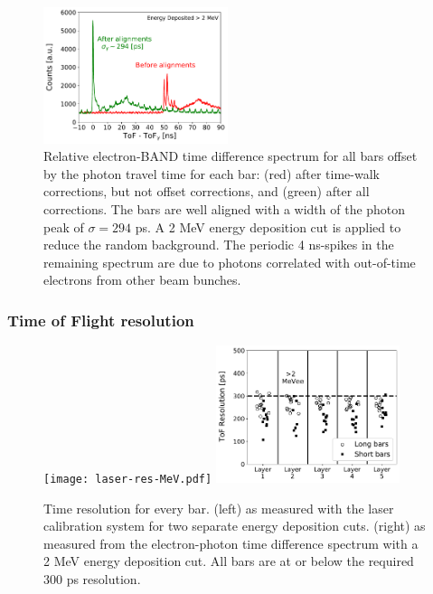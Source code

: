\documentclass[3p,final,twocolumn]{elsarticle}
\begin{document}
\begin{figure}[tb]
	\centering
		\includegraphics[width=0.48\textwidth]{time-alignment.pdf}
                \caption{Relative electron-BAND time difference
                  spectrum for all bars offset by the photon travel
                  time for each bar: (red) after time-walk
                  corrections, but not offset corrections, and (green)
                  after all corrections. The bars are well
                  aligned with a width of the photon peak of
                  $\sigma=294$ \si{\pico\s}. A 2
                  \si{\mega\electronvolt} energy deposition cut is
                  applied to reduce the random background.  The
                  periodic 4 \si{\nano\s}-spikes in the remaining
                  spectrum are due to photons correlated with out-of-time
                  electrons from other beam bunches.}
	\label{fig:final_offset}
\end{figure}

\subsubsection{Time of Flight resolution}
\label{sec:tofresolution}
\begin{figure}[tb]
	\centering
			\texttt{[image: laser-res-MeV.pdf]}
		\includegraphics[width=0.48\textwidth]{tof-resolutions-photons-2MeV.pdf}
	\caption{Time resolution for every bar. (left) as measured
          with the laser calibration system for two separate energy
          deposition cuts\protect\footnotemark. (right) as measured
          from the electron-photon time difference spectrum with a
          2 \si{\mega\electronvolt} energy deposition cut. All bars
          are at or below the required 300 \si{\pico\s} resolution. }
	\label{fig:tof_resolution}
\end{figure}
\end{document}

